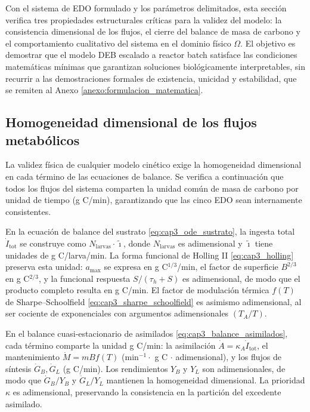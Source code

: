 
Con el sistema de EDO formulado y los parámetros delimitados, esta sección verifica tres propiedades estructurales críticas para la validez del modelo: la consistencia dimensional de los flujos, el cierre del balance de masa de carbono y el comportamiento cualitativo del sistema en el dominio físico $\Omega$. El objetivo es demostrar que el modelo DEB escalado a reactor batch satisface las condiciones matemáticas mínimas que garantizan soluciones biológicamente interpretables, sin recurrir a las demostraciones formales de existencia, unicidad y estabilidad, que se remiten al Anexo \ref{anexo:formulacion_matematica}.

\subsection{Homogeneidad dimensional de los flujos metabólicos}
\label{subsec:cap3_dimensional_resumen}

La validez física de cualquier modelo cinético exige la homogeneidad dimensional en cada término de las ecuaciones de balance. Se verifica a continuación que todos los flujos del sistema comparten la unidad común de masa de carbono por unidad de tiempo (g C/min), garantizando que las cinco EDO sean internamente consistentes.

En la ecuación de balance del sustrato \eqref{eq:cap3_ode_sustrato}, la ingesta total $\dot{I}_{\mathrm{tot}}$ se construye como $N_{\mathrm{larvas}} \cdot \tilde{\imath}$, donde $N_{\mathrm{larvas}}$ es adimensional y $\tilde{\imath}$ tiene unidades de g C/larva/min. La forma funcional de Holling II \eqref{eq:cap3_holling} preserva esta unidad: $a_{\max}$ se expresa en g C$^{1/3}$/min, el factor de superficie $B^{2/3}$ en g C$^{2/3}$, y la funcional respuesta $S/(\tau_h + S)$ es adimensional, de modo que el producto completo resulta en g C/min. El factor de modulación térmica $f(T)$ de Sharpe--Schoolfield \eqref{eq:cap3_sharpe_schoolfield} es asimismo adimensional, al ser cociente de exponenciales con argumentos adimensionales $(T_A/T)$.

En el balance cuasi-estacionario de asimilados \eqref{eq:cap3_balance_asimilados}, cada término comparte la unidad g C/min: la asimilación $\dot{A} = \kappa_A \dot{I}_{\mathrm{tot}}$, el mantenimiento $\dot{M} = m B f(T)$ (min$^{-1} \cdot$ g C $\cdot$ adimensional), y los flujos de síntesis $\dot{G}_B, \dot{G}_L$ (g C/min). Los rendimientos $Y_B$ y $Y_L$ son adimensionales, de modo que $\dot{G}_B/Y_B$ y $\dot{G}_L/Y_L$ mantienen la homogeneidad dimensional. La prioridad $\kappa$ es adimensional, preservando la consistencia en la partición del excedente asimilado.

